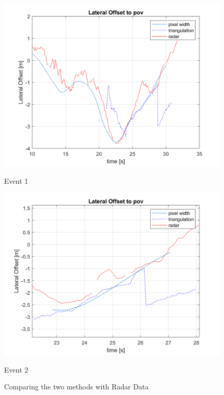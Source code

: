 \begin{figure}[H]
    \centering
\begin{minipage}[b]{0.49\textwidth}
    \includegraphics[width=\textwidth]{FiguresMat/homography_comparison_lat_10794257.png}
    \caption*{Event 1}
\end{minipage}
\begin{minipage}[b]{0.50\textwidth}
    \includegraphics[width=\textwidth]{FiguresMat/homography_comparison_lat_116147345.png}
    \caption*{Event 2}
\end{minipage}
\caption{Comparing the two methods with Radar Data}
\label{fig:triangulation_comparison_latoffset}
\end{figure}

